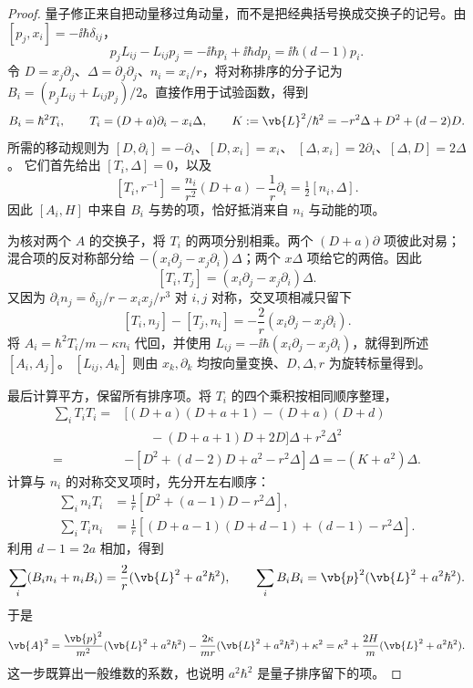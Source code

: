 \begin{proof}
量子修正来自把动量移过角动量，而不是把经典括号换成交换子的记号。由 $[p_j,x_i]=-\ii\hbar\delta_{ij}$，
\begin{equation}
 p_jL_{ij}-L_{ij}p_j
 =-\ii\hbar p_i+\ii\hbar d p_i
 =\ii\hbar(d-1)p_i.
 \label{eq:phys-hdqm-runge-lenz-ordering}
\end{equation}
令 $D=x_j\partial_j$、$\Delta=\partial_j\partial_j$、$n_i=x_i/r$，将对称排序的分子记为 $B_i=(p_jL_{ij}+L_{ij}p_j)/2$。直接作用于试验函数，得到
\[
 B_i=\hbar^2T_i,\qquad
 T_i=(D+a)\partial_i-x_i\Delta,
 \qquad
 K:=\vb{L}^2/\hbar^2=-r^2\Delta+D^2+(d-2)D.
\]
所需的移动规则为
$[D,\partial_i]=-\partial_i$、$[D,x_i]=x_i$、
$[\Delta,x_i]=2\partial_i$、$[\Delta,D]=2\Delta$。
它们首先给出 $[T_i,\Delta]=0$，以及
\[
 [T_i,r^{-1}]=\frac{n_i}{r^2}(D+a)-\frac1r\partial_i
             =\tfrac12[n_i,\Delta].
\]
因此 $[A_i,H]$ 中来自 $B_i$ 与势的项，恰好抵消来自 $n_i$ 与动能的项。

为核对两个 $A$ 的交换子，将 $T_i$ 的两项分别相乘。两个 $(D+a)\partial$ 项彼此对易；混合项的反对称部分给 $-(x_i\partial_j-x_j\partial_i)\Delta$；两个 $x\Delta$ 项给它的两倍。因此
\[
 [T_i,T_j]=(x_i\partial_j-x_j\partial_i)\Delta.
\]
又因为 $\partial_i n_j=\delta_{ij}/r-x_ix_j/r^3$ 对 $i,j$ 对称，交叉项相减只留下
\[
 [T_i,n_j]-[T_j,n_i]=-
 \frac2r(x_i\partial_j-x_j\partial_i).
\]
将 $A_i=\hbar^2T_i/m-\kappa n_i$ 代回，并使用
$L_{ij}=-\ii\hbar(x_i\partial_j-x_j\partial_i)$，就得到所述 $[A_i,A_j]$。
$[L_{ij},A_k]$ 则由 $x_k,\partial_k$ 均按向量变换、$D,\Delta,r$ 为旋转标量得到。

最后计算平方，保留所有排序项。将 $T_i$ 的四个乘积按相同顺序整理，
\begin{align*}
 \sum_iT_iT_i
 ={}&\bigl[(D+a)(D+a+1)-(D+a)(D+d)\\
 &\qquad -(D+a+1)D+2D\bigr]\Delta+r^2\Delta^2\\
 ={}&-[D^2+(d-2)D+a^2-r^2\Delta]\Delta
 =-(K+a^2)\Delta.
\end{align*}
计算与 $n_i$ 的对称交叉项时，先分开左右顺序：
\begin{align*}
 \sum_i n_iT_i&=\frac1r[D^2+(a-1)D-r^2\Delta],\\
 \sum_i T_in_i&=\frac1r[(D+a-1)(D+d-1)+(d-1)-r^2\Delta].
\end{align*}
利用 $d-1=2a$ 相加，得到
\[
 \sum_i(B_in_i+n_iB_i)=\frac2r(\vb{L}^2+a^2\hbar^2),
 \qquad
 \sum_iB_iB_i=\vb{p}^2(\vb{L}^2+a^2\hbar^2).
\]
于是
\[
 \vb{A}^2
 =\frac{\vb{p}^2}{m^2}(\vb{L}^2+a^2\hbar^2)
 -\frac{2\kappa}{mr}(\vb{L}^2+a^2\hbar^2)+\kappa^2
 =\kappa^2+\frac{2H}{m}(\vb{L}^2+a^2\hbar^2).
\]
这一步既算出一般维数的系数，也说明 $a^2\hbar^2$ 是量子排序留下的项。
\end{proof}

